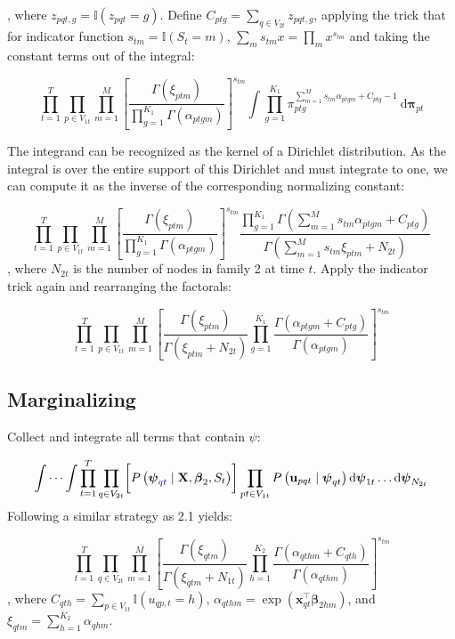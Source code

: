 \documentclass{article}
\begin{document}
, where $z_{pqt,g} = \mathbb{I}(z_{pqt} = g)$. Define $C_{ptg} = \sum_{q \in V_{2t}} z_{pqt,g}$, applying the trick that for indicator function $s_{tm} = \mathbb{I}(S_t = m)$, $\sum_m s_{tm}x = \prod_m x^{s_{tm}}$ and taking the constant terms out of the integral: 

$$\prod_{t=1}^{T} \prod_{p \in V_{1t}}  \prod_{m=1}^{M}\left[\frac{\Gamma\left(\xi_{p t m}\right)}{\prod_{g=1}^{K_1} \Gamma\left(\alpha_{p t g m}\right)}\right]^{s_{tm}} \int \prod_{g=1}^{K_1} \pi_{p t g}^{\sum_{m=1}^M s_{tm} \alpha_{p t g m}+C_{p t g}-1} \mathrm{~d} \boldsymbol{\pi}_{p t} $$

The integrand can be recognized as the kernel of a Dirichlet distribution. As the integral is over the entire support of this Dirichlet and must integrate to one, we can compute it as the inverse of the corresponding normalizing constant:

$$
\prod_{t=1}^T \prod_{p \in V_{1t}} \prod_{m=1}^M \left[ \frac{\Gamma\left(\xi_{ptm}\right)}{\prod_{g=1}^{K_1} \Gamma\left(\alpha_{ptgm}\right)} \right]^{s_{tm}} \frac{\prod_{g=1}^{K_1} \Gamma\left( \sum_{m=1}^M s_{tm}\alpha_{ptgm} + C_{ptg} \right)}{\Gamma \left(\sum_{m=1}^{M} s_{tm}\xi_{ptm} + N_{2t} \right)}
$$
, where $N_{2t}$ is the number of nodes in family 2 at time $t$. Apply the indicator trick again and rearranging the factorals:

\begin{equation} \label{eq2}
\prod_{t=1}^T \prod_{p \in V_{1t}} \prod_{m=1}^M \left[ \frac{\Gamma\left(\xi_{ptm}\right)}{\Gamma \left( \xi_{ptm} + N_{2t} \right)}\prod_{g=1}^{K_1}\frac{ \Gamma\left( \alpha_{ptgm} + C_{ptg} \right)}{\Gamma\left(\alpha_{ptgm}\right)}  \right]^{s_{tm}}  
\end{equation}

\subsection{Marginalizing \boldsymbol{\Psi}}

Collect and integrate all terms that contain $\psi$:

$$
\int \cdots \int \prod_{t=1}^T  \prod_{q \in V_{2t}}\biggl[P\left(\boldsymbol{\psi}_{\textcolor{blue}{qt}} \mid \mathbf{X}, \boldsymbol{\beta}_2, S_t\right)\biggr] \prod_{pt \in V_{1t}} P\left(\mathbf{u}_{pqt} \mid \boldsymbol{\psi}_{qt}\right)  \mathrm{d} \boldsymbol{\psi}_{1t} \ldots \mathrm{d} \boldsymbol{\psi}_{N_{2t}}
$$
Following a similar strategy as 2.1 yields:

\begin{equation} \label{eq3}
\prod_{t=1}^T \prod_{q \in V_{2t}} \prod_{m=1}^M \left[ \frac{\Gamma\left(\xi_{qtm}\right)}{\Gamma \left( \xi_{qtm} + N_{1t} \right)}\prod_{h=1}^{K_2}\frac{ \Gamma\left( \alpha_{qthm} + C_{qth} \right)}{\Gamma\left(\alpha_{qthm}\right)}  \right]^{s_{tm}}  
\end{equation}
, where $C_{qth} = \sum_{p \in V_{1t}} \mathbb{I}(u_{qp,t} = h)$, $\alpha_{qthm} = \exp \left(\mathbf{x}_{qt}^{\top}\boldsymbol{\beta}_{2hm} \right)$, and $\xi_{qtm} = \sum_{h=1}^{K_2} \alpha_{qhm}$.
\end{document}
